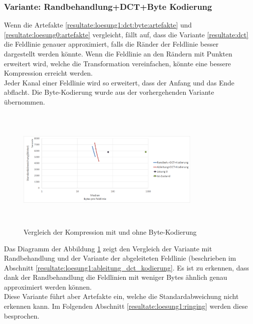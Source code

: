 \subsubsection{Variante: Randbehandlung+DCT+Byte Kodierung} \label{resultate:loesung1:dct:randbeh+byte}
Wenn  die Artefakte \ref{resultate:loesung1:dct:byte:artefakte} und \ref{resultate:loesung0:artefakte} vergleicht, fällt auf, dass die Variante \ref{resultate:dct} die Feldlinie genauer approximiert, falls die Ränder der Feldlinie besser dargestellt werden könnte. Wenn die Feldlinie an den Rändern mit Punkten erweitert wird, welche die Transformation vereinfachen, könnte eine bessere Kompression erreicht werden.\\
Jeder Kanal einer Feldlinie wird so erweitert, dass der Anfang und das Ende abflacht. Die Byte-Kodierung wurde aus der vorhergehenden Variante übernommen.
\begin{figure}[!htbp]
	\center	\includegraphics[width=0.8\textwidth,height=6cm,keepaspectratio]{./pictures/resultate/loesung1/loesung1-7/loesung1_7.png}
	\caption{Vergleich der Kompression mit und ohne Byte-Kodierung}
	\label{resultate:loesung1:dct:randbehandlung}
\end{figure}
Das Diagramm der Abbildung \ref{resultate:loesung1:dct:randbehandlung} zeigt den Vergleich der Variante mit Randbehandlung und der Variante der abgeleiteten Feldlinie (beschrieben im Abschnitt \ref{resultate:loesung1:ableitung_dct_kodierung}. Es ist zu erkennen, dass dank der Randbehandlung die Feldlinien mit weniger Bytes ähnlich genau approximiert werden können.\\
Diese Variante führt aber Artefakte ein, welche die Standardabweichung nicht erkennen kann. Im Folgenden Abschnitt \ref{resultate:loesung1:ringing} werden diese besprochen.

